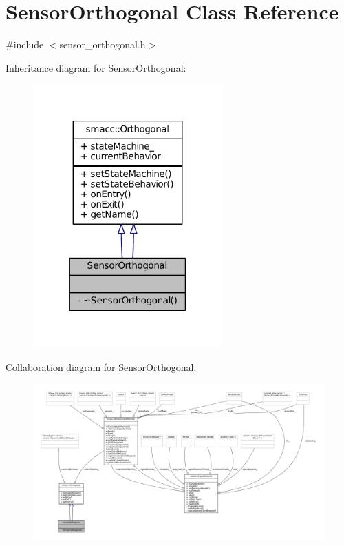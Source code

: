 \hypertarget{classSensorOrthogonal}{}\section{Sensor\+Orthogonal Class Reference}
\label{classSensorOrthogonal}


{\ttfamily \#include $<$sensor\+\_\+orthogonal.\+h$>$}



Inheritance diagram for Sensor\+Orthogonal\+:
\nopagebreak
\begin{figure}[H]
\begin{center}
\leavevmode
\includegraphics[width=206pt]{classSensorOrthogonal__inherit__graph}
\end{center}
\end{figure}


Collaboration diagram for Sensor\+Orthogonal\+:
\nopagebreak
\begin{figure}[H]
\begin{center}
\leavevmode
\includegraphics[width=350pt]{classSensorOrthogonal__coll__graph}
\end{center}
\end{figure}
